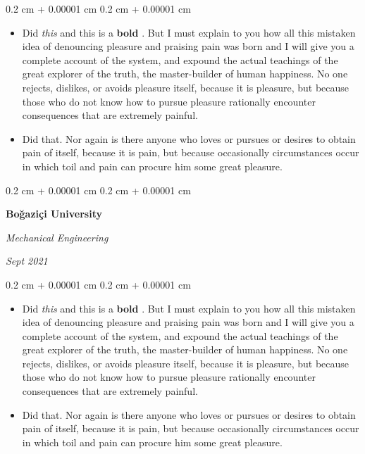 \documentclass[10pt, letterpaper]{article}
\newenvironment{highlights}{
    \begin{itemize}[
        topsep=0.10 cm,
        parsep=0.10 cm,
        partopsep=0pt,
        itemsep=0pt,
        leftmargin=0.4 cm + 10pt
    ]
}{
    \end{itemize}
} %
\newenvironment{onecolentry}{
    \begin{adjustwidth}{
        0.2 cm + 0.00001 cm
    }{
        0.2 cm + 0.00001 cm
    }
}{
    \end{adjustwidth}
} %
\newenvironment{twocolentry}[2][]{
    \onecolentry
    \def\secondColumn{#2}
    \setcolumnwidth{\fill, 4.5 cm}
    \begin{paracol}{2}
}{
    \switchcolumn \raggedleft \secondColumn
    \end{paracol}
    \endonecolentry
} %
\let\hrefWithoutArrow\href
\renewcommand{\href}[2]{\hrefWithoutArrow{#1}{\ifthenelse{\equal{#2}{}}{ }{#2 }\raisebox{.15ex}{\footnotesize \faExternalLink*}}}
\begin{document}
        \vspace{0.10 cm}
        \begin{onecolentry}
            \begin{highlights}
                \item Did \textit{this} and this is a \textbf{bold} \href{https://example.com}{link}. But I must explain to you how all this mistaken idea of denouncing pleasure and praising pain was born and I will give you a complete account of the system, and expound the actual teachings of the great explorer of the truth, the master-builder of human happiness. No one rejects, dislikes, or avoids pleasure itself, because it is pleasure, but because those who do not know how to pursue pleasure rationally encounter consequences that are extremely painful.
                \item Did that. Nor again is there anyone who loves or pursues or desires to obtain pain of itself, because it is pain, but because occasionally circumstances occur in which toil and pain can procure him some great pleasure.
            \end{highlights}
        \end{onecolentry}


        \vspace{0.2 cm}

        \begin{twocolentry}{
            
            
        \textit{Sept 2021}}
            \textbf{Boğaziçi University}

            \textit{Mechanical Engineering}
        \end{twocolentry}

        \vspace{0.10 cm}
        \begin{onecolentry}
            \begin{highlights}
                \item Did \textit{this} and this is a \textbf{bold} \href{https://example.com}{link}. But I must explain to you how all this mistaken idea of denouncing pleasure and praising pain was born and I will give you a complete account of the system, and expound the actual teachings of the great explorer of the truth, the master-builder of human happiness. No one rejects, dislikes, or avoids pleasure itself, because it is pleasure, but because those who do not know how to pursue pleasure rationally encounter consequences that are extremely painful.
                \item Did that. Nor again is there anyone who loves or pursues or desires to obtain pain of itself, because it is pain, but because occasionally circumstances occur in which toil and pain can procure him some great pleasure.
            \end{highlights}
        \end{onecolentry}
\end{document}
